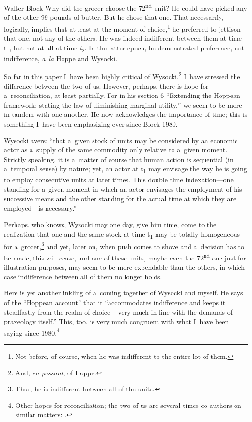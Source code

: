 \begin{artengenv}{Walter Block}
Why did the grocer choose the 72\textsuperscript{nd} unit? He could have picked any of the other 99 pounds of butter. But he chose that one. That necessarily, logically, implies that at least at the moment of choice,\footnote{Not before, of course, when he was indifferent to the entire lot of them.} he preferred to jettison that one, not any of the others. He was indeed indifferent between them at time t\textsubscript{1}, but not at all at time \textit{t}\textsubscript{2}. In the latter epoch, he demonstrated preference, not indifference, \textit{a~la} Hoppe and Wysocki.

So far in this paper I~have been highly critical of Wysocki.\footnote{And, \textit{en passant}, of Hoppe.} I~have stressed the difference between the two of us. However, perhaps, there is hope for a~reconciliation, at least partially. For in his section 6 ``Extending the Hoppean framework: stating the law of diminishing marginal utility,'' we seem to be more in tandem with one another. He now acknowledges the importance of time; this is something I~have been emphasizing ever since Block 1980.

Wysocki avers: ``that a~given stock of units may be considered by an economic actor as a~supply of the same commodity only relative to a~given moment. Strictly speaking, it is a~matter of course that human action is sequential (in a~temporal sense) by nature; yet, an actor at t\textsubscript{1} may envisage the way he is going to employ consecutive units at later times. This double time indexation---one standing for a~given moment in which an actor envisages the employment of his successive means and the other standing for the actual time at which they are employed---is necessary.''

Perhaps, who knows, Wysocki may one day, give him time, come to the realization that one and the same stock at time t\textsubscript{1} may be totally homogeneous for a~grocer,\footnote{Thus, he is indifferent between all of the units.} and yet, later on, when push comes to shove and a~decision has to be made, this will cease, and one of these units, maybe even the 72\textsuperscript{nd} one just for illustration purposes, may seem to be more expendable than the others, in which case indifference between all of them no longer holds.

Here is yet another inkling of a~coming together of Wysocki and myself. He says of the ``Hoppean account'' that it ``accommodates indifference and keeps it steadfastly from the realm of choice -- very much in line with the demands of praxeology itself.'' This, too, is very much congruent with what I~have been saying since 1980.\footnote{Other hopes for reconciliation; the two of us are several times co-authors on similar matters:
\parencites[][]{wysocki_analysis_2018}[][]{wysocki_homogeneity_2019}.%
}


\end{artengenv}
